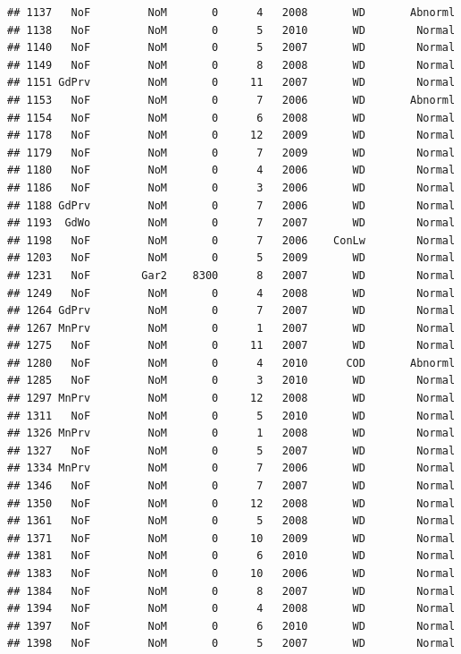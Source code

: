 \documentclass[]{article}
\begin{document}
\begin{verbatim}
## 1137   NoF         NoM       0      4   2008       WD       Abnorml
## 1138   NoF         NoM       0      5   2010       WD        Normal
## 1140   NoF         NoM       0      5   2007       WD        Normal
## 1149   NoF         NoM       0      8   2008       WD        Normal
## 1151 GdPrv         NoM       0     11   2007       WD        Normal
## 1153   NoF         NoM       0      7   2006       WD       Abnorml
## 1154   NoF         NoM       0      6   2008       WD        Normal
## 1178   NoF         NoM       0     12   2009       WD        Normal
## 1179   NoF         NoM       0      7   2009       WD        Normal
## 1180   NoF         NoM       0      4   2006       WD        Normal
## 1186   NoF         NoM       0      3   2006       WD        Normal
## 1188 GdPrv         NoM       0      7   2006       WD        Normal
## 1193  GdWo         NoM       0      7   2007       WD        Normal
## 1198   NoF         NoM       0      7   2006    ConLw        Normal
## 1203   NoF         NoM       0      5   2009       WD        Normal
## 1231   NoF        Gar2    8300      8   2007       WD        Normal
## 1249   NoF         NoM       0      4   2008       WD        Normal
## 1264 GdPrv         NoM       0      7   2007       WD        Normal
## 1267 MnPrv         NoM       0      1   2007       WD        Normal
## 1275   NoF         NoM       0     11   2007       WD        Normal
## 1280   NoF         NoM       0      4   2010      COD       Abnorml
## 1285   NoF         NoM       0      3   2010       WD        Normal
## 1297 MnPrv         NoM       0     12   2008       WD        Normal
## 1311   NoF         NoM       0      5   2010       WD        Normal
## 1326 MnPrv         NoM       0      1   2008       WD        Normal
## 1327   NoF         NoM       0      5   2007       WD        Normal
## 1334 MnPrv         NoM       0      7   2006       WD        Normal
## 1346   NoF         NoM       0      7   2007       WD        Normal
## 1350   NoF         NoM       0     12   2008       WD        Normal
## 1361   NoF         NoM       0      5   2008       WD        Normal
## 1371   NoF         NoM       0     10   2009       WD        Normal
## 1381   NoF         NoM       0      6   2010       WD        Normal
## 1383   NoF         NoM       0     10   2006       WD        Normal
## 1384   NoF         NoM       0      8   2007       WD        Normal
## 1394   NoF         NoM       0      4   2008       WD        Normal
## 1397   NoF         NoM       0      6   2010       WD        Normal
## 1398   NoF         NoM       0      5   2007       WD        Normal

\end{verbatim}
\end{document}
